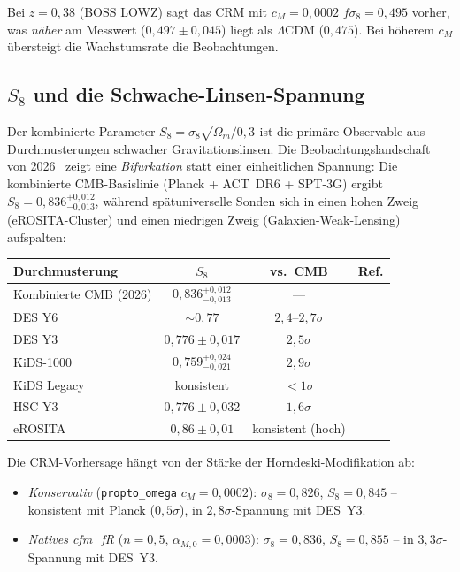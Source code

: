 \documentclass[11pt,a4paper]{article}
\begin{document}
Bei $z = 0{,}38$ (BOSS LOWZ) sagt das CRM mit $c_M = 0{,}0002$ $f\sigma_8 = 0{,}495$ vorher, was \textit{n\"aher} am Messwert ($0{,}497 \pm 0{,}045$) liegt als $\Lambda$CDM ($0{,}475$). Bei h\"oherem $c_M$ \"ubersteigt die Wachstumsrate die Beobachtungen.

\subsection{$S_8$ und die Schwache-Linsen-Spannung}
\label{subsec:s8_comparison}

Der kombinierte Parameter $S_8 = \sigma_8\sqrt{\Omega_m/0{,}3}$ ist die prim\"are Observable aus Durchmusterungen schwacher Gravitationslinsen. Die Beobachtungslandschaft von 2026~\cite{S8Review2026} zeigt eine \emph{Bifurkation} statt einer einheitlichen Spannung: Die kombinierte CMB-Basislinie (Planck + ACT~DR6 + SPT-3G) ergibt $S_8 = 0{,}836^{+0{,}012}_{-0{,}013}$, w\"ahrend sp\"atuniverselle Sonden sich in einen hohen Zweig (eROSITA-Cluster) und einen niedrigen Zweig (Galaxien-Weak-Lensing) aufspalten:

\begin{center}
\small
\begin{tabular}{lccc}
\toprule
\textbf{Durchmusterung} & $S_8$ & \textbf{vs.\ CMB} & \textbf{Ref.} \\
\midrule
Kombinierte CMB (2026) & $0{,}836^{+0{,}012}_{-0{,}013}$ & --- & \cite{S8Review2026} \\
\midrule
DES Y6 & $\sim 0{,}77$ & $2{,}4$--$2{,}7\sigma$ & \cite{DESY6} \\
DES Y3 & $0{,}776 \pm 0{,}017$ & $2{,}5\sigma$ & \cite{DESY3} \\
KiDS-1000 & $0{,}759^{+0{,}024}_{-0{,}021}$ & $2{,}9\sigma$ & \cite{KiDS2021} \\
KiDS Legacy & konsistent & $< 1\sigma$ & \cite{S8Review2026} \\
HSC Y3 & $0{,}776 \pm 0{,}032$ & $1{,}6\sigma$ & \\
eROSITA & $0{,}86 \pm 0{,}01$ & konsistent (hoch) & \\
\bottomrule
\end{tabular}
\end{center}

Die CRM-Vorhersage h\"angt von der St\"arke der Horndeski-Modifikation ab:
\begin{itemize}
\item \textit{Konservativ} (\texttt{propto\_omega} $c_M = 0{,}0002$): $\sigma_8 = 0{,}826$, $S_8 = 0{,}845$ -- konsistent mit Planck ($0{,}5\sigma$), in $2{,}8\sigma$-Spannung mit DES~Y3.
\item \textit{Natives cfm\_fR} ($n = 0{,}5$, $\alpha_{M,0} = 0{,}0003$): $\sigma_8 = 0{,}836$, $S_8 = 0{,}855$ -- in $3{,}3\sigma$-Spannung mit DES~Y3.
\end{itemize}
\end{document}
